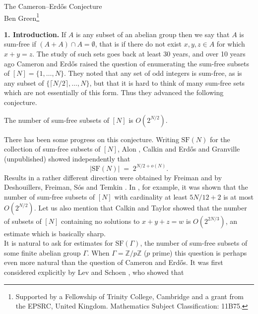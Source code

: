 \documentclass[a4paper,12pt]{article}
\begin{document}
\begin{center}
\Large The Cameron--Erd\H{o}s Conjecture\\[15pt]
\large Ben Green\footnote{Supported by a Fellowship of Trinity College, Cambridge and a grant from the EPSRC, United Kingdom. Mathematics Subject Classification: 11B75.}
\end{center}
\begin{abstract} \noindent A subset $A$ of the integers is said to be \textit{sum-free} if there do not exist elements $x,y,z \in A$ with $x + y = z$. It is shown that the number of sum-free subsets of $\{1,\dots,N\}$ is $O(2^{N/2})$, confirming a well-known conjecture of Cameron and Erd\H{o}s.
\end{abstract}
\noindent\textbf{1. Introduction.} If $A$ is any subset of an abelian group then we say that $A$ is sum-free if $(A + A) \cap A = \emptyset$, that is if there do not exist $x,y,z \in A$ for which $x + y = z$. The study of such sets goes back at least 30 years, and over 10 years ago Cameron and Erd\H{o}s \cite{CE1,CE2} raised the question of enumerating the sum-free subsets of $[N] = \{1,\dots,N\}$. They noted that any set of odd integers is sum-free, as is any subset of $\{\lceil N/2 \rceil,\dots, N\}$, but that it is hard to think of many sum-free sets which are not essentially of this form. Thus they advanced the following conjecture.
\begin{conjectureenv} \label{conj1}The number of sum-free subsets of $[N]$ is $O(2^{N/2})$.
\end{conjectureenv}
There has been some progress on this conjecture. Writing $\mbox{SF}(N)$ for the collection of sum-free subsets of $[N]$, Alon \cite{Alon}, Calkin \cite{Calk} and Erd\H{o}s and Granville (unpublished) showed independently that
\begin{equation}\label{ACEG}
|\mbox{SF}(N)| \; = \; 2^{N/2 + o(N)}.
\end{equation}
Results in a rather different direction were obtained by Freiman \cite{Frei4} and by Deshouillers, Freiman, S\'os and Temkin \cite{DFST}. In \cite{Frei4}, for example, it was shown that the number of sum-free subsets of $[N]$ with cardinality at least $5N/12 + 2$ is at most $O(2^{N/2})$. Let us also mention that Calkin and Taylor \cite{CT} showed that the number of subsets of $[N]$ containing no solutions to $x + y + z = w$ is $O(2^{2N/3})$, an estimate which is basically sharp.\\[11pt]
It is natural to ask for estimates for $\mbox{SF}(\Gamma)$, the number of sum-free subsets of some finite abelian group $\Gamma$. When $\Gamma = \mathbb{Z}/p\mathbb{Z}$ ($p$ prime) this question is perhaps even more natural than the question of Cameron and Erd\H{o}s. It was first considered explicitly by Lev and Schoen \cite{LS}, who showed that 
\end{document}
